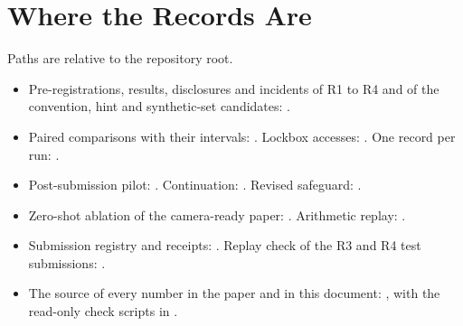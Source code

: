 \documentclass[conference]{IEEEtran}
\begin{document}
\section{Where the Records Are}\label{sec:records}
Paths are relative to the repository root.
\begin{itemize}
\raggedright
\item Pre-registrations, results, disclosures and incidents of R1 to R4 and of the convention, hint and synthetic-set candidates: .
\item Paired comparisons with their intervals: . Lockbox accesses: . One record per run: .
\item Post-submission pilot: . Continuation: . Revised safeguard: .
\item Zero-shot ablation of the camera-ready paper: . Arithmetic replay: .
\item Submission registry and receipts: . Replay check of the R3 and R4 test submissions: .
\item The source of every number in the paper and in this document: , with the read-only check scripts in .
\end{itemize}
\end{document}
